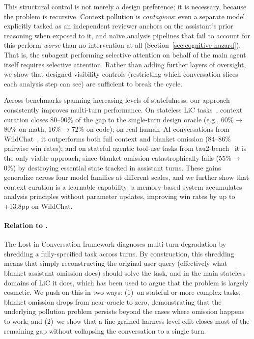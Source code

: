 \documentclass{article}
\begin{document}
This structural control is not merely a design preference; it is necessary, because the problem is recursive. Context pollution is \emph{contagious}: even a separate model explicitly tasked as an independent reviewer anchors on the assistant's prior reasoning when exposed to it, and na\"ive analysis pipelines that fail to account for this perform \emph{worse} than no intervention at all (Section~\ref{sec:cognitive-hazard}). That is, the subagent performing selective attention on behalf of the main agent itself requires selective attention. Rather than adding further layers of oversight, we show that designed visibility controls (restricting which conversation slices each analysis step can see) are sufficient to break the cycle.

Across benchmarks spanning increasing levels of statefulness, our approach consistently improves multi-turn performance. On stateless LiC tasks~\citep{laban2025lost}, context curation closes 80--90\% of the gap to the single-turn design oracle (e.g., 60\%$\to$80\% on math, 16\%$\to$72\% on code); on real human--AI conversations from WildChat~\citep{zhao2024wildchat}, it outperforms both full context and blanket omission (84--86\% pairwise win rates); and on stateful agentic tool-use tasks from tau2-bench~\citep{barres2025tau2} it is the only viable approach, since blanket omission catastrophically fails (55\%$\to$0\%) by destroying essential state tracked in assistant turns. These gains generalize across four model families at different scales, and we further show that context curation is a learnable capability: a memory-based system accumulates analysis principles without parameter updates, improving win rates by up to +13.8pp on WildChat.

\paragraph{Relation to \citet{laban2025lost}.} The Lost in Conversation framework diagnoses multi-turn degradation by shredding a fully-specified task across turns. By construction, this shredding means that simply reconstructing the original user query (effectively what blanket assistant omission does) should solve the task, and in the main stateless domains of LiC it does, which has been used to argue that the problem is largely cosmetic. We push on this in two ways: (1)~on stateful or more complex tasks, blanket omission drops from near-oracle to zero, demonstrating that the underlying pollution problem persists beyond the cases where omission happens to work; and (2)~we show that a fine-grained harness-level edit closes most of the remaining gap without collapsing the conversation to a single turn.
\end{document}
